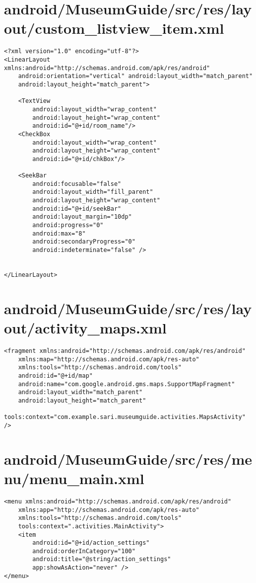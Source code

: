 \section{android/MuseumGuide/src/res/layout/custom\_listview\_item.xml}
\begin{lstlisting}<?xml version="1.0" encoding="utf-8"?>
<LinearLayout xmlns:android="http://schemas.android.com/apk/res/android"
    android:orientation="vertical" android:layout_width="match_parent"
    android:layout_height="match_parent">

    <TextView
        android:layout_width="wrap_content"
        android:layout_height="wrap_content"
        android:id="@+id/room_name"/>
    <CheckBox
        android:layout_width="wrap_content"
        android:layout_height="wrap_content"
        android:id="@+id/chkBox"/>

    <SeekBar
        android:focusable="false"
        android:layout_width="fill_parent"
        android:layout_height="wrap_content"
        android:id="@+id/seekBar"
        android:layout_margin="10dp"
        android:progress="0"
        android:max="8"
        android:secondaryProgress="0"
        android:indeterminate="false" />


</LinearLayout>
\end{lstlisting}
\newpage
\section{android/MuseumGuide/src/res/layout/activity\_maps.xml}
\begin{lstlisting}<fragment xmlns:android="http://schemas.android.com/apk/res/android"
    xmlns:map="http://schemas.android.com/apk/res-auto"
    xmlns:tools="http://schemas.android.com/tools"
    android:id="@+id/map"
    android:name="com.google.android.gms.maps.SupportMapFragment"
    android:layout_width="match_parent"
    android:layout_height="match_parent"
    tools:context="com.example.sari.museumguide.activities.MapsActivity" />
\end{lstlisting}
\newpage
\section{android/MuseumGuide/src/res/menu/menu\_main.xml}
\begin{lstlisting}<menu xmlns:android="http://schemas.android.com/apk/res/android"
    xmlns:app="http://schemas.android.com/apk/res-auto"
    xmlns:tools="http://schemas.android.com/tools"
    tools:context=".activities.MainActivity">
    <item
        android:id="@+id/action_settings"
        android:orderInCategory="100"
        android:title="@string/action_settings"
        app:showAsAction="never" />
</menu>
\end{lstlisting}
\newpage

